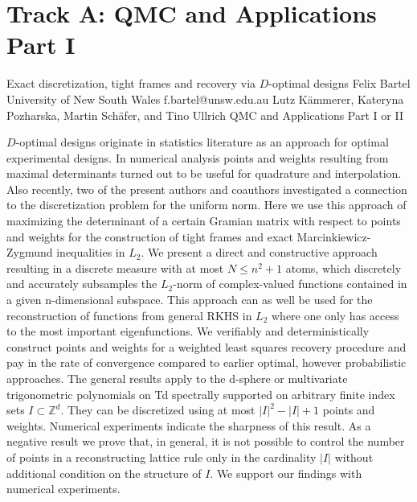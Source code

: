 \section{Track A: QMC and Applications Part I}\newpage

\begin{talk}
  {Exact discretization, tight frames and recovery via $D$-optimal designs}%
  {Felix Bartel}%
  {University of New South Wales}%
  {f.bartel@unsw.edu.au}%
  {Lutz K\"ammerer, Kateryna Pozharska, Martin Sch\"afer, and Tino Ullrich}%
  {QMC and Applications Part I or II}%
    
   
    $D$-optimal designs originate in statistics literature as an approach for optimal experimental designs. In numerical analysis points and weights resulting from maximal determinants turned out to be useful for quadrature and interpolation. Also recently, two of the present authors and coauthors investigated a connection to the discretization problem for the uniform norm. Here we use this approach of maximizing the determinant of a certain Gramian matrix with respect to points and weights for the construction of tight frames and exact Marcinkiewicz-Zygmund inequalities in $L_2$. We present a direct and constructive approach resulting in a discrete measure with at most $N\le n^2+1$ atoms, which discretely and accurately subsamples the $L_2$-norm of complex-valued functions contained in a given n-dimensional subspace. This approach can as well be used for the reconstruction of functions from general RKHS in $L_2$ where one only has access to the most important eigenfunctions. We verifiably and deterministically construct points and weights for a weighted least squares recovery procedure and pay in the rate of convergence compared to earlier optimal, however probabilistic approaches. The general results apply to the d-sphere or multivariate trigonometric polynomials on Td spectrally supported on arbitrary finite index sets $I\subset\mathbb Z^d$. They can be discretized using at most $|I|^2-|I|+1$ points and weights. Numerical experiments indicate the sharpness of this result. As a negative result we prove that, in general, it is not possible to control the number of points in a reconstructing lattice rule only in the cardinality $|I|$ without additional condition on the structure of $I$. We support our findings with numerical experiments.

\medskip

\end{talk}

